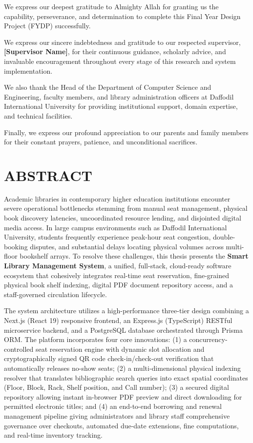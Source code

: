 We express our deepest gratitude to Almighty Allah for granting us the capability, perseverance, and determination to complete this Final Year Design Project (FYDP) successfully.

We express our sincere indebtedness and gratitude to our respected supervisor, \textbf{[Supervisor Name]}, for their continuous guidance, scholarly advice, and invaluable encouragement throughout every stage of this research and system implementation.

We also thank the Head of the Department of Computer Science and Engineering, faculty members, and library administration officers at Daffodil International University for providing institutional support, domain expertise, and technical facilities.

Finally, we express our profound appreciation to our parents and family members for their constant prayers, patience, and unconditional sacrifices.

\cleardoublepage
\section*{ABSTRACT}

Academic libraries in contemporary higher education institutions encounter severe operational bottlenecks stemming from manual seat management, physical book discovery latencies, uncoordinated resource lending, and disjointed digital media access. In large campus environments such as Daffodil International University, students frequently experience peak-hour seat congestion, double-booking disputes, and substantial delays locating physical volumes across multi-floor bookshelf arrays. To resolve these challenges, this thesis presents the \textbf{Smart Library Management System}, a unified, full-stack, cloud-ready software ecosystem that cohesively integrates real-time seat reservation, fine-grained physical book shelf indexing, digital PDF document repository access, and a staff-governed circulation lifecycle.

The system architecture utilizes a high-performance three-tier design combining a Next.js (React 19) responsive frontend, an Express.js (TypeScript) RESTful microservice backend, and a PostgreSQL database orchestrated through Prisma ORM. The platform incorporates four core innovations: (1) a concurrency-controlled seat reservation engine with dynamic slot allocation and cryptographically signed QR code check-in/check-out verification that automatically releases no-show seats; (2) a multi-dimensional physical indexing resolver that translates bibliographic search queries into exact spatial coordinates (Floor, Block, Rack, Shelf position, and Call number); (3) a secured digital repository allowing instant in-browser PDF preview and direct downloading for permitted electronic titles; and (4) an end-to-end borrowing and renewal management pipeline giving administrators and library staff comprehensive governance over checkouts, automated due-date extensions, fine computations, and real-time inventory tracking.

